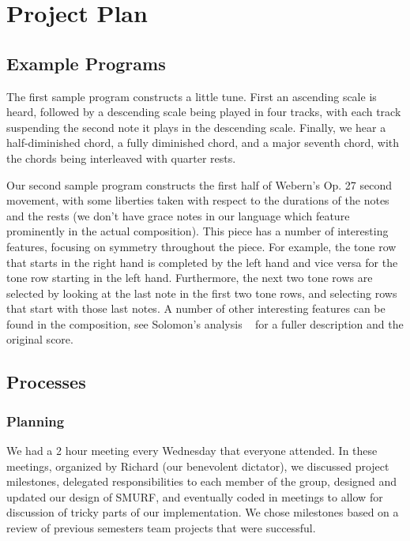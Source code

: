 \section{Project Plan}

\subsection{Example Programs}

The first sample program constructs a little tune. First an ascending scale is heard, followed by a descending scale being played in four tracks, with each
track suspending the second note it plays in the descending scale. Finally, we hear a half-diminished chord, a fully diminished chord, and a major seventh chord,
with the chords being interleaved with quarter rests.




Our second sample program constructs the first half of Webern's Op. 27 second movement, with some liberties taken with respect to the durations of the notes and the
rests (we don't have grace notes in our language which feature prominently in the actual composition). This piece has a number of interesting features, focusing
on symmetry throughout the piece. For example, the tone row that starts in the right hand is completed by the left hand and vice versa for the tone row starting 
in the left hand. Furthermore, the next two tone rows are selected by looking at the last note in the first two tone rows, and selecting rows that start with
those last notes. A number of other interesting features can be found in the composition, see Solomon's analysis ~\cite{webern} for a fuller description and
the original score.




	\subsection{Processes}
		
		\subsubsection{Planning}
		We had a 2 hour meeting every Wednesday that everyone attended. In these meetings, organized by Richard (our benevolent dictator), we discussed project milestones, delegated responsibilities to each member of the group, designed and updated our design of SMURF, and eventually coded in meetings to allow for discussion of tricky parts of our implementation. We chose milestones based on a review of previous semesters team projects that were successful. 
				
